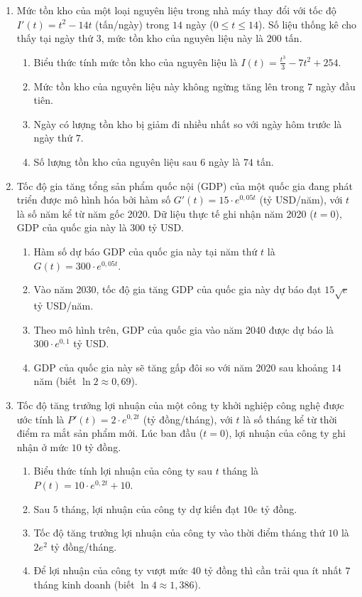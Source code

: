 \documentclass[12pt]{article}
\begin{document}
\begin{enumerate}[label=\textbf{Câu \arabic*.}, start=1]
		\item Mức tồn kho của một loại nguyên liệu trong nhà máy thay đổi với tốc độ $I'(t) = t^2 - 14t$ (tấn/ngày) trong $14$ ngày ($0 \le t \le 14$). Số liệu thống kê cho thấy tại ngày thứ $3$, mức tồn kho của nguyên liệu này là $200$ tấn.
		\begin{enumerate}[label=\alph*)]
			\item Biểu thức tính mức tồn kho của nguyên liệu là $I(t) = \frac{t^3}{3} - 7t^2 + 254$.
			\item Mức tồn kho của nguyên liệu này không ngừng tăng lên trong $7$ ngày đầu tiên.
			\item Ngày có lượng tồn kho bị giảm đi nhiều nhất so với ngày hôm trước là ngày thứ $7$.
			\item Số lượng tồn kho của nguyên liệu sau $6$ ngày là $74$ tấn.
		\end{enumerate}
		
		\item Tốc độ gia tăng tổng sản phẩm quốc nội (GDP) của một quốc gia đang phát triển được mô hình hóa bởi hàm số $G'(t) = 15 \cdot e^{0,05t}$ (tỷ USD/năm), với $t$ là số năm kể từ năm gốc 2020. Dữ liệu thực tế ghi nhận năm 2020 ($t=0$), GDP của quốc gia này là $300$ tỷ USD.
		\begin{enumerate}[label=\alph*)]
			\item Hàm số dự báo GDP của quốc gia này tại năm thứ $t$ là $G(t) = 300 \cdot e^{0,05t}$.
			\item Vào năm 2030, tốc độ gia tăng GDP của quốc gia này dự báo đạt $15\sqrt{e}$ tỷ USD/năm.
			\item Theo mô hình trên, GDP của quốc gia vào năm 2040 được dự báo là $300 \cdot e^{0,1}$ tỷ USD.
			\item GDP của quốc gia này sẽ tăng gấp đôi so với năm 2020 sau khoảng $14$ năm (biết $\ln 2 \approx 0,69$).
		\end{enumerate}
		
		\item Tốc độ tăng trưởng lợi nhuận của một công ty khởi nghiệp công nghệ được ước tính là $P'(t) = 2 \cdot e^{0,2t}$ (tỷ đồng/tháng), với $t$ là số tháng kể từ thời điểm ra mắt sản phẩm mới. Lúc ban đầu ($t=0$), lợi nhuận của công ty ghi nhận ở mức $10$ tỷ đồng.
		\begin{enumerate}[label=\alph*)]
			\item Biểu thức tính lợi nhuận của công ty sau $t$ tháng là $P(t) = 10 \cdot e^{0,2t} + 10$.
			\item Sau $5$ tháng, lợi nhuận của công ty dự kiến đạt $10e$ tỷ đồng.
			\item Tốc độ tăng trưởng lợi nhuận của công ty vào thời điểm tháng thứ $10$ là $2e^2$ tỷ đồng/tháng.
			\item Để lợi nhuận của công ty vượt mức $40$ tỷ đồng thì cần trải qua ít nhất $7$ tháng kinh doanh (biết $\ln 4 \approx 1,386$).
		\end{enumerate}
		

\end{enumerate}
\end{document}
